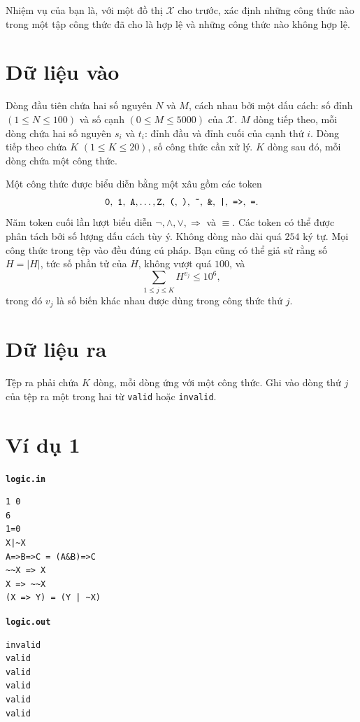 \documentclass[11pt]{article}
\begin{document}
Nhiệm vụ của bạn là, với một đồ thị \(\mathcal X\) cho trước, xác định những
công thức nào trong một tập công thức đã cho là hợp lệ và những công thức nào
không hợp lệ.

\section*{Dữ liệu vào}

Dòng đầu tiên chứa hai số nguyên \(N\) và \(M\), cách nhau bởi một dấu cách:
số đỉnh \((1\le N\le 100)\) và số cạnh \((0\le M\le 5000)\) của
\(\mathcal X\). \(M\) dòng tiếp theo, mỗi dòng chứa hai số nguyên \(s_i\) và
\(t_i\): đỉnh đầu và đỉnh cuối của cạnh thứ \(i\). Dòng tiếp theo chứa
\(K\) \((1\le K\le 20)\), số công thức cần xử lý. \(K\) dòng sau đó, mỗi dòng
chứa một công thức.

Một công thức được biểu diễn bằng một xâu gồm các token
\[
  \texttt{0},\ \texttt{1},\ \texttt{A},\ldots,\texttt{Z},\ \texttt{(},\
  \texttt{)},\ \texttt{\~{}},\ \texttt{\&},\ \texttt{|},\ \texttt{=>},\
  \texttt{=}.
\]
Năm token cuối lần lượt biểu diễn \(\neg,\land,\lor,\Rightarrow\) và
\(\equiv\). Các token có thể được phân tách bởi số lượng dấu cách tùy ý. Không
dòng nào dài quá \(254\) ký tự. Mọi công thức trong tệp vào đều đúng cú pháp.
Bạn cũng có thể giả sử rằng số \(H=|H|\), tức số phần tử của \(H\), không vượt
quá \(100\), và
\[
  \sum_{1\le j\le K} H^{v_j}\le 10^6,
\]
trong đó \(v_j\) là số biến khác nhau được dùng trong công thức thứ \(j\).

\section*{Dữ liệu ra}

Tệp ra phải chứa \(K\) dòng, mỗi dòng ứng với một công thức. Ghi vào dòng thứ
\(j\) của tệp ra một trong hai từ \texttt{valid} hoặc \texttt{invalid}.

\section*{Ví dụ 1}

\noindent\begin{minipage}[t]{0.48\linewidth}
\textbf{\texttt{logic.in}}
\begin{verbatim}
1 0
6
1=0
X|~X
A=>B=>C = (A&B)=>C
~~X => X
X => ~~X
(X => Y) = (Y | ~X)
\end{verbatim}
\end{minipage}\hfill
\begin{minipage}[t]{0.45\linewidth}
\textbf{\texttt{logic.out}}
\begin{verbatim}
invalid
valid
valid
valid
valid
valid
\end{verbatim}
\end{minipage}
\end{document}
